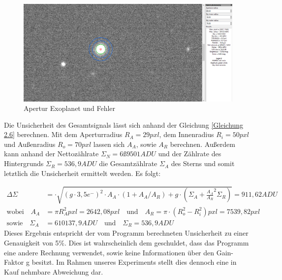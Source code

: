 \documentclass[ngerman,ruledheaders=section,class=report,thesis={type=Protokoll},accentcolor=1b,marginpar=false,parskip=half-,fontsize=11pt,]{tudapub}
\begin{document}
	\begin{figure}[h]
		\centering
		\includegraphics[width=0.8\linewidth]{Quick_Photometry_Fehler.PNG}
		\caption{Apertur Exoplanet und Fehler}
		\label{Abbildung 4.41}
	\end{figure}
	
	Die Unsicherheit des Gesamtsignals lässt sich anhand der Gleichung \ref{Gleichung 2.6} berechnen. Mit dem Aperturradius $R_A = 29\si{pxl}$, dem Innenradius $R_i = 50 \si{pxl}$ und Außenradius $R_o = 70 \si{pxl}$ lassen sich $A_A$, sowie $A_R$ berechnen. Außerdem kann anhand der Nettozählrate $\Sigma_N = 6ß9501 \si{ADU}$ und der Zählrate des Hintergrunds $\Sigma_R = 536,9\si{ADU}$ die Gesamtzählrate $\Sigma_A$ des Sterns und somit letztlich die Unsicherheit ermittelt werden. Es folgt:
	
	\begin{equation}
		\begin{aligned}
			\Delta \Sigma &= \cdot \sqrt{(g \cdot 3,5 e^-)^2 \cdot A_A \cdot (1 + A_A /A_R) + g \cdot \left( 
				\Sigma_A + \frac{A_A}{A_R}^2 \Sigma_R
				\right)} = 911,62 \si{ADU} \\
			\text{wobei}
			\quad
			A_A &= \pi R_A ^2 \si{pxl}= 2642,08 \si{pxl} 
			\quad 
			\text{und} 
			\quad
			A_R = \pi \cdot (R_o ^2 - R_i^2) \si{pxl} = 7539,82 \si{pxl} \\
			\text{sowie}
			\quad
			\Sigma_A &= 610137,9 \si{ADU} 
			\quad
			\text{und}
			\quad
			\Sigma_R = 536,9 \si{ADU}
		\end{aligned}
	\end{equation}
	Dieses Ergebnis entspricht der vom Programm berechneten Unsicherheit zu einer Genauigkeit von 5\%. Dies ist wahrscheinlich dem geschuldet, dass das Programm eine andere Rechnung verwendet, sowie keine Informationen über den Gain-Faktor g besitzt. Im Rahmen unseres Experiments stellt dies dennoch eine in Kauf nehmbare Abweichung dar.  
	
\end{document}
